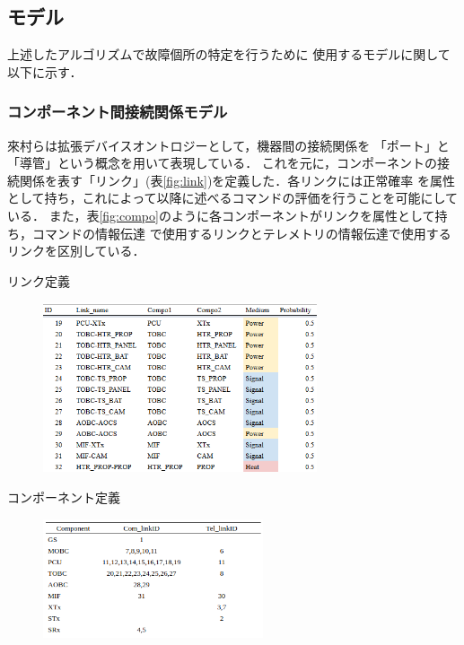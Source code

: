\documentclass[11pt]{jsarticle}%
\begin{document}
\begin{multicols}{2}
\subsection{モデル}%
上述したアルゴリズムで故障個所の特定を行うために
使用するモデルに関して以下に示す．

\subsubsection{コンポーネント間接続関係モデル}
來村ら\cite{Kitamura01}は拡張デバイスオントロジーとして，機器間の接続関係を
「ポート」と「導管」という概念を用いて表現している．
これを元に，コンポーネントの接続関係を表す「リンク」(表\ref{fig:link})を定義した．各リンクには正常確率
を属性として持ち，これによって以降に述べるコマンドの評価を行うことを可能にしている．
また，表\ref{fig:compo}のように各コンポーネントがリンクを属性として持ち，コマンドの情報伝達
で使用するリンクとテレメトリの情報伝達で使用するリンクを区別している．
\begin{table}[H]
  \centering
  \caption{リンク定義}
  \label{fig:link}
\end{table}
\vspace{-3zh}
\begin{figure}[H]
  \centering
    \includegraphics[height=5.0cm]{../figure/link_definition_resume.png}
\end{figure}
\vspace{-2zh}

\begin{table}[H]
  \centering
  \caption{コンポーネント定義}
  \label{fig:compo}
\end{table}
\vspace{-3zh}
\begin{figure}[H]
  \centering
    \includegraphics[height=3.5cm]{../figure/compo_link_resume.png}
\end{figure}


\end{multicols}
\end{document}

